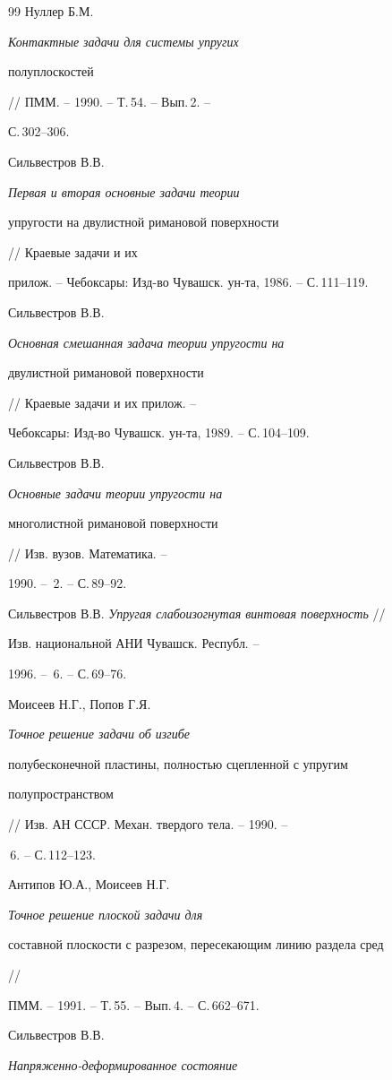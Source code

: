\begin{thebibliography}{99}
Нуллер Б.М. {\em Контактные задачи для системы упругих 


полуплоскостей} // ПММ. -- 1990. -- Т.\,54. -- Вып.\,2. -- 


С.\,302--306. 




Сильвестров В.В. {\em Первая и вторая основные задачи теории 


упругости на двулистной римановой поверхности} // Краевые задачи и их 


прилож. -- Чебоксары: Изд-во Чувашск. ун-та, 1986. -- С.\,111--119. 




Сильвестров В.В. {\em Основная смешанная задача теории упругости на 


двулистной римановой поверхности} // Краевые задачи и их прилож. -- 


Чебоксары: Изд-во Чувашск. ун-та, 1989. -- С.\,104--109. 




Сильвестров В.В. {\em Основные задачи теории упругости на 


многолистной римановой поверхности} // Изв. вузов. Математика. -- 


1990. -- \No\,2. -- С.\,89--92. 




Сильвестров В.В. {\em Упругая слабоизогнутая винтовая поверхность} // 


Изв. национальной АНИ Чувашск. Республ. -- 


1996. -- \No\,6. -- С.\,69--76. 




Моисеев Н.Г., Попов Г.Я. {\em Точное решение задачи об изгибе 


полубесконечной пластины, полностью сцепленной с упругим 


полупространством} // Изв. АН СССР. Механ. твердого тела. -- 1990. -- 


\No\,6. -- С.\,112--123. 




Антипов Ю.А., Моисеев Н.Г. {\em Точное решение плоской задачи для 


составной плоскости с разрезом, пересекающим линию раздела сред} // 


ПММ. -- 1991. -- Т.\,55. -- Вып.\,4. -- С.\,662--671. 




Сильвестров В.В. {\em Напряженно-деформированное состояние 


}
\end{thebibliography}
